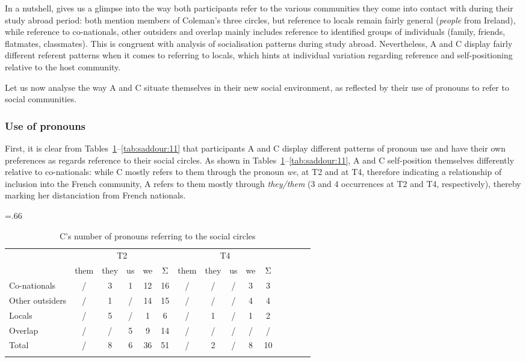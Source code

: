 \documentclass[output=paper]{langscibook}
\begin{document}
In a nutshell,  gives us a glimpse into the way both participants refer to the various communities they come into contact with during their study abroad period: both mention members of Coleman’s three circles, but reference to locals remain fairly general (\textit{people} from Ireland), while reference to co-nationals, other outsiders and overlap mainly includes reference to identified groups of individuals (family, friends, flatmates, classmates). This is congruent with  analysis of socialisation patterns during study abroad. Nevertheless, A and C display fairly different referent patterns when it comes to referring to locals, which hints at individual variation regarding reference and self-positioning relative to the host community.

Let us now analyse the way A and C situate themselves in their new social environment, as reflected by their use of pronouns to refer to social communities.

\subsubsection{Use of pronouns}

First, it is clear from Tables~\ref{tab:saddour:10}--\ref{tab:saddour:11} that participants A and C display different patterns of pronoun use and have their own preferences as regards reference to their social circles. As shown in Tables~\ref{tab:saddour:10}--\ref{tab:saddour:11}, A and C self-position themselves differently relative to co-nationals: while C mostly refers to them through the pronoun \textit{we}, at T2 and at T4, therefore indicating a relationship of inclusion into the French community, A refers to them mostly through \textit{they/them} (3 and 4 occurrences at T2 and T4, respectively), thereby marking her distanciation from French nationals.

\begin{table}\tabcolsep=.66\tabcolsep%
\begin{tabular}{lcccccccccccccc}
\lsptoprule
& \multicolumn{5}{c}{{T2}} & \multicolumn{5}{c}{{T4}}\\\cmidrule(lr){2-6}\cmidrule(lr){7-11}
& {them} & {they} & {us} & {we} & {Σ} & {them} & {they} & {us} & {we} & {Σ}\\\midrule
Co-nationals & / & 3 & 1 & 12 & 16 & / & / & / & 3 & 3\\
Other outsiders & / & 1 & / & 14 & 15 & / & / & / & 4 & 4\\
Locals & / & 5 & / & 1 & 6 & / & 1 & / & 1 & 2\\
Overlap & / & / & 5 & 9 & 14 & / & / & / & / & /\\\midrule
{Total} & / & 8 & 6 & 36 & 51 & / & 2 & / & 8 & 10\\
\lspbottomrule
\end{tabular}
\caption{C’s number of pronouns referring to the social circles\label{tab:saddour:10}}
\end{table}
\end{document}
